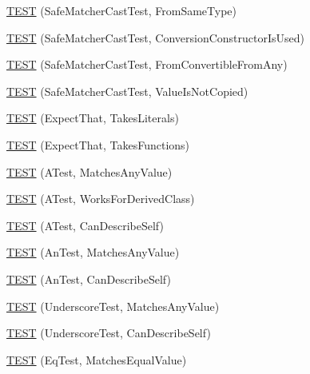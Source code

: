 \begin{DoxyCompactItemize}
\item 
\hyperlink{namespacetesting_1_1gmock__matchers__test_a9fc149b429176a45e45267132ae901bd}{T\+E\+ST} (Safe\+Matcher\+Cast\+Test, From\+Same\+Type)
\item 
\hyperlink{namespacetesting_1_1gmock__matchers__test_aa608f074e26876d41333cd265c4ca008}{T\+E\+ST} (Safe\+Matcher\+Cast\+Test, Conversion\+Constructor\+Is\+Used)
\item 
\hyperlink{namespacetesting_1_1gmock__matchers__test_a0490279eed67f8fa45f83c4951e1d8a1}{T\+E\+ST} (Safe\+Matcher\+Cast\+Test, From\+Convertible\+From\+Any)
\item 
\hyperlink{namespacetesting_1_1gmock__matchers__test_ac82f8355af7a1e6ba3b67ba8423a1d73}{T\+E\+ST} (Safe\+Matcher\+Cast\+Test, Value\+Is\+Not\+Copied)
\item 
\hyperlink{namespacetesting_1_1gmock__matchers__test_a7672c72f955b937542acd87d18dd7ea6}{T\+E\+ST} (Expect\+That, Takes\+Literals)
\item 
\hyperlink{namespacetesting_1_1gmock__matchers__test_aafaf5273bd3d8ba273a5dd243d3a52ba}{T\+E\+ST} (Expect\+That, Takes\+Functions)
\item 
\hyperlink{namespacetesting_1_1gmock__matchers__test_af15da53cdc65283b8ca688a03801fd12}{T\+E\+ST} (A\+Test, Matches\+Any\+Value)
\item 
\hyperlink{namespacetesting_1_1gmock__matchers__test_a2b2dfb85d18883b07f7d13d21abee2fc}{T\+E\+ST} (A\+Test, Works\+For\+Derived\+Class)
\item 
\hyperlink{namespacetesting_1_1gmock__matchers__test_a24432bc861bee430fb8ac1a4e5463ecf}{T\+E\+ST} (A\+Test, Can\+Describe\+Self)
\item 
\hyperlink{namespacetesting_1_1gmock__matchers__test_a15bf6771986d1e9f675f29861f7551c1}{T\+E\+ST} (An\+Test, Matches\+Any\+Value)
\item 
\hyperlink{namespacetesting_1_1gmock__matchers__test_ac3b18688ca5b5cf2d6137ce3e7397691}{T\+E\+ST} (An\+Test, Can\+Describe\+Self)
\item 
\hyperlink{namespacetesting_1_1gmock__matchers__test_a3fc77fa5ca709ef70963026fd7114552}{T\+E\+ST} (Underscore\+Test, Matches\+Any\+Value)
\item 
\hyperlink{namespacetesting_1_1gmock__matchers__test_a25ae831c15c9ca918ed847ba147ac572}{T\+E\+ST} (Underscore\+Test, Can\+Describe\+Self)
\item 
\hyperlink{namespacetesting_1_1gmock__matchers__test_a2ac5d4c2fae3e7f2e6c6be657a61f86a}{T\+E\+ST} (Eq\+Test, Matches\+Equal\+Value)
\item 

\end{DoxyCompactItemize}
